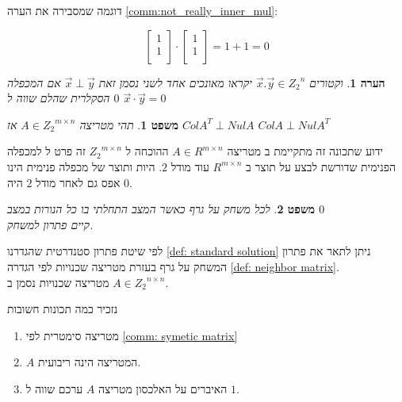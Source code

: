 \documentclass[12pt,twoside]{article}
\newtheorem{theorem}{משפט}[section]
\newtheorem{comm}{הערה}[section]
\newcommand{\Zn}{{Z_2}^n}
\begin{document}
דוגמה 
שמסבירה את הערה
\ref{comm:not_really_inner_mul}:

\[
    \begin{bmatrix}
    1 \\
    1 \\
    \end{bmatrix}    
    \cdot 
    \begin{bmatrix}
    1 \\
    1 \\
    \end{bmatrix} 
    = 1 + 1 = 0
\]

\begin{comm}
    וקטורים 
    $\vec{x}. \vec{y} \in \Zn $
    יקראו מאונכים אחד לשני נסמן זאת 
    $\vec{x} \perp  \vec{y}$
    אם המכפלה הסקלרית שהלם שווה 
    ל
    $0$
    $\vec{x} \cdot \vec{y} = 0$
\end{comm}

\begin{theorem}
    \label{the: Nul A and Col AT}
    תהי מטריצה 
    $A \in {Z_2}^{m \times n }$
    אז 
    $ColA^T \perp Nul A$
    $ColA \perp Nul A^T$
\end{theorem}

ידוע שתכונה זה מתקיימת 
ב
מטריצה 
$A \in R^{m \times n}$
ההוכחה 
ל
$ {Z_2}^{m \times n}$
זה
פרט ל
למכפלה הפנימית 
שדורשת 
לבצע על תוצר 
ב
$R^{m \times n}$
עוד 
מודל 
$2$.
היות ותוצר של מכפלה פנימית הינו אפס גם לאחר מודל 
$2$
היה 
$0$.

\begin{theorem}
    \label{thrm: clean game has solution}
    לכל משחק על גרף כאשר המצב התחלתי בו כל הנורות במצב 
    $0$
    \\
    קיים פתרון למשחק.
\end{theorem}

לפי 
שיטת פתרון סטנדרטית 
שהגדרנו
\ref{def: standard solution}
ניתן לתאר את פתרון המשחק על גרף בעזרת מטריצה
שכנויות לפי הגדרה 
\ref{def: neighbor matrix}.
\\
מטריצה שכנויות
נסמן ב
$A \in {Z_2}^{n \times n}$.

נזכיר כמה תכונות חשובות
\begin{enumerate}
    \item 
    מטריצה סימטרית לפי
    \ref{comm: symetic matrix}
    \item 
    $A$
    המטריצה הינה ריבועית.
    \item 
    האיברים על האלכסון
    מטריצה 
    $A$
    ערכם שווה ל
    $1$.
\end{enumerate}
\end{document}
